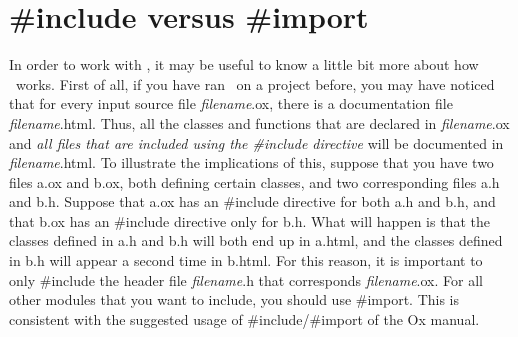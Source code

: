 \section{\#include versus \#import}
In order to work with \oxdoc, it may be useful to know a little bit more about how
\oxdoc~works. First of all, if you have ran \oxdoc~on a project before, you may have
noticed that for every input source file \textit{filename}.ox, there is a documentation file 
\textit{filename}.html. Thus, all the classes and functions that are declared in \textit{filename}.ox
and \textit{all files that are included using the \#include directive}
will be documented in \textit{filename}.html. To illustrate the implications of this, suppose that
you have two files a.ox and b.ox, both defining certain classes, and two corresponding
files a.h and b.h. Suppose that a.ox has an \#include directive for both a.h and b.h,
and that b.ox has an \#include directive only for b.h.
What will happen is that the classes defined in a.h and b.h will both end up in a.html,
and the classes defined in b.h will appear a second time in b.html. 
For this reason, it is important to only \#include the header file \textit{filename}.h that 
corresponds \textit{filename}.ox. For all other modules that you want to include, you should 
use \#import. This is consistent with the suggested usage of \#include/\#import of the Ox manual.

